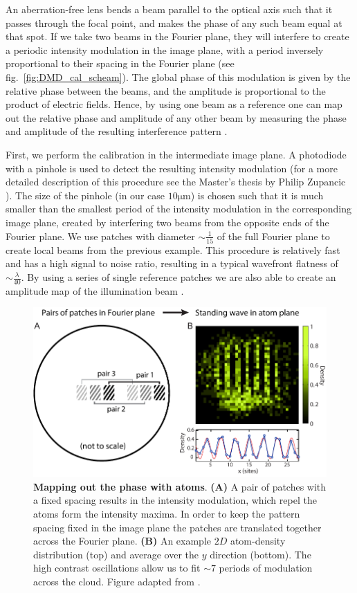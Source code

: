An aberration-free lens bends a beam parallel to the optical axis such that it passes through the focal point, and makes the phase of any such beam equal at that spot. If we take two beams in the Fourier plane, they will interfere to create a periodic intensity modulation in the image plane, with a period inversely proportional to their spacing in the Fourier plane (see fig.~\ref{fig:DMD_cal_scheam}). The global phase of this modulation is given by the relative phase between the beams, and the amplitude is proportional to the product of electric fields. Hence, by using one beam as a reference one can map out the relative phase and amplitude of any other beam by measuring the phase and amplitude of the resulting interference pattern \cite{Zupancic2016}.

First, we perform the calibration in the intermediate image plane. A photodiode with a pinhole is used to detect the resulting intensity modulation (for a more detailed description of this procedure see the Master’s thesis by Philip Zupancic \cite{Zupancic thesis}). The size of the pinhole (in our case $10 \mathrm{\mu m}$) is chosen such that it is much smaller than the smallest period of the intensity modulation in the corresponding image plane, created by interfering two beams from the opposite ends of the Fourier plane. We use patches with diameter $\sim \frac{1}{15}$ of the full Fourier plane to create local beams from the previous example. This procedure is relatively fast and has a high signal to noise ratio, resulting in a typical wavefront flatness of $\sim \frac{\lambda}{40}$. By using a series of single reference patches we are also able to create an amplitude map of the illumination beam \cite{Zupancic2016}.  

\begin{figure}[t]
	\centering
	\includegraphics[scale=1]{figures/DMD_cal_atoms.pdf}
	\caption{{\bf Mapping out the phase with atoms}. {\bf (A)} A pair of patches with a fixed spacing results in the intensity modulation, which repel the atoms form the intensity maxima. In order to keep the pattern spacing fixed in the image plane the patches are translated together across the Fourier plane. {\bf (B)} An example $2D$ atom-density distribution (top) and average over the $y$ direction (bottom). The high contrast oscillations allow us to fit $\sim 7$ periods of modulation across the cloud.  Figure adapted from \cite{Zupancic2016}.}
	\label{fig:DMD_FPcal}
\end{figure}


